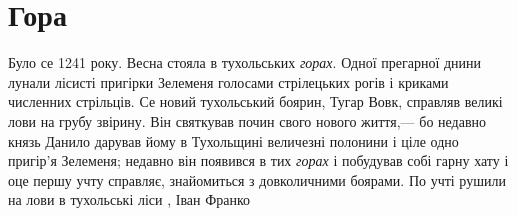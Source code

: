  
 
 
 
 
\chapter{Гора}

Було се 1241 року. Весна стояла в тухольських \emph{горах}.  Одної прегарної
днини лунали лісисті пригірки Зелеменя голосами стрілецьких рогів і криками
численних стрільців.  Се новий тухольський боярин, Тугар Вовк, справляв великі
лови на грубу звірину. Він святкував почин свого нового життя,— бо недавно
князь Данило дарував йому в Тухольщині величезні полонини і ціле одно пригір'я
Зелеменя; недавно він появився в тих \emph{горах} і побудував собі гарну хату і
оце першу учту справляє, знайомиться з довколичними боярами. По учті рушили на
лови в тухольські ліси
, Іван Франко
